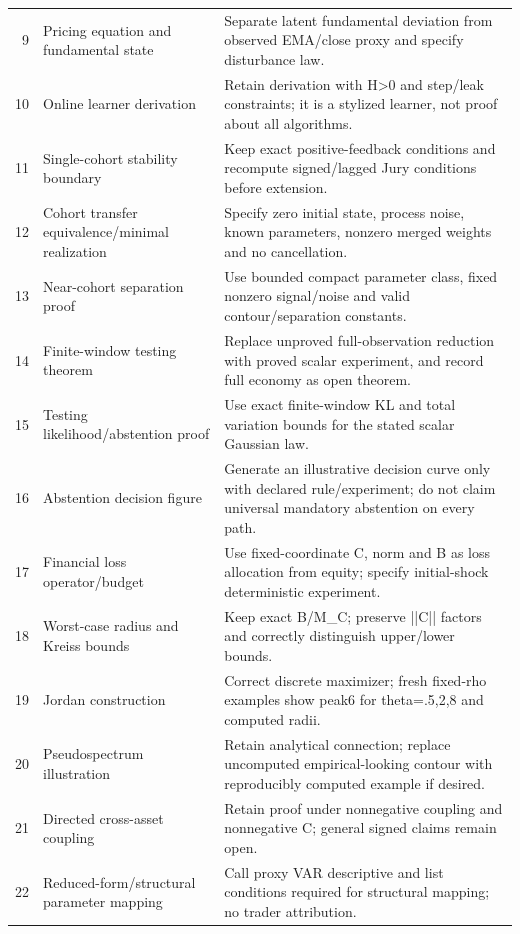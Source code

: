 \begin{longtable}{rp{}p{}}
9 & Pricing equation and fundamental state & Separate latent fundamental deviation from observed EMA/close proxy and specify disturbance law.\\
10 & Online learner derivation & Retain derivation with H>0 and step/leak constraints; it is a stylized learner, not proof about all algorithms.\\
11 & Single-cohort stability boundary & Keep exact positive-feedback conditions and recompute signed/lagged Jury conditions before extension.\\
12 & Cohort transfer equivalence/\allowbreak minimal realization & Specify zero initial state, process noise, known parameters, nonzero merged weights and no cancellation.\\
13 & Near-cohort separation proof & Use bounded compact parameter class, fixed nonzero signal/noise and valid contour/separation constants.\\
14 & Finite-window testing theorem & Replace unproved full-observation reduction with proved scalar experiment, and record full economy as open theorem.\\
15 & Testing likelihood/\allowbreak abstention proof & Use exact finite-window KL and total variation bounds for the stated scalar Gaussian law.\\
16 & Abstention decision figure & Generate an illustrative decision curve only with declared rule/experiment; do not claim universal mandatory abstention on every path.\\
17 & Financial loss operator/\allowbreak budget & Use fixed-coordinate C, norm and B as loss allocation from equity; specify initial-shock deterministic experiment.\\
18 & Worst-case radius and Kreiss bounds & Keep exact B/M\_C; preserve ||C|| factors and correctly distinguish upper/lower bounds.\\
19 & Jordan construction & Correct discrete maximizer; fresh fixed-rho examples show peak6 for theta=.5,2,8 and computed radii.\\
20 & Pseudospectrum illustration & Retain analytical connection; replace uncomputed empirical-looking contour with reproducibly computed example if desired.\\
21 & Directed cross-asset coupling & Retain proof under nonnegative coupling and nonnegative C; general signed claims remain open.\\
22 & Reduced-form/\allowbreak structural parameter mapping & Call proxy VAR descriptive and list conditions required for structural mapping; no trader attribution.\\

\end{longtable}
